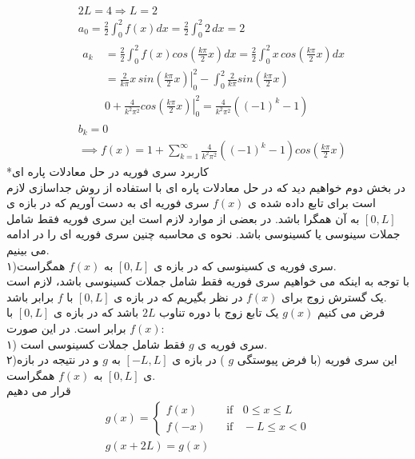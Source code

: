 \begin{equation*}
	\begin{aligned}
		{} &\
		2L=4\Rightarrow L=2
		\\ &\
		a_0=\frac{2}{2}\int_0^2{f(x)dx}=\frac{2}{2}\int_0^2{2 \, dx}=2
		\\ &\
		\begin{aligned}
			a_k {} &\
			= \frac{2}{2}\int_0^2{f(x)cos\left(\frac{k\pi}{2}x\right)dx}=
			\frac{2}{2}\int_0^2{x\,cos\left(\frac{k\pi}{2}x\right)dx}
			\\ &\
			=\left.{\frac{2}{k\pi}x \, sin\left(\frac{k\pi}{2}x\right)}\right |_0^2-\int_0^2{\frac{2}{k\pi} sin\left(\frac{k\pi}{2}x\right)}
			\\ &\
			0+\frac{4}{k^2\pi^2}\left.{cos\left(\frac{k\pi}{2}x\right)} \right |_0^2
			=\frac{4}{k^2\pi^2}\left( (-1)^k-1\right)
		\end{aligned}
		\\ &\
		b_k = 0
		\\ &\
		\implies f(x)=1+\sum_{k=1}^\infty{\frac{4}{k^2\pi^2}\left( (-1)^k-1\right)cos\left( \frac{k\pi}{2}x\right)}
	\end{aligned}
\end{equation*}
*کاربرد سری فوریه در حل معادلات پاره ای\\
در بخش دوم خواهیم دید که در حل معادلات پاره ای با استفاده از روش جداسازی لازم است برای تابع داده شده ی
$f(x)$
سری فوریه ای به دست آوریم که در بازه ی
$[0,L]$
به آن همگرا باشد. در  بعضی از موارد لازم است این سری فوریه فقط شامل جملات سینوسی یا کسینوسی باشد. نحوه ی محاسبه چنین سری فوریه ای را در ادامه می بینیم.\\
۱)سری فوریه ی کسینوسی که در بازه ی
$[0,L]$
به 
$f(x)$
همگراست.\\
با توجه به اینکه می خواهیم سری فوریه فقط شامل جملات کسینوسی باشد، لازم است یک گسترش زوج برای 
$f(x)$
در نظر بگیریم که در بازه ی
$[0,L]$
با 
$f$
برابر باشد.\\
فرض می کنیم 
$g(x)$
یک تابع زوج با دوره تناوب
$2L$
باشد که در بازه ی
$[0,L]$
با 
$f(x)$
برابر است. در این صورت:\\
۱) سری فوریه ی 
$g$
فقط شامل جملات کسینوسی است.\\
۲)این سری فوریه (با فرض پیوستگی
$g$
)
در بازه ی
$[-L,L]$
به
$g$
و در نتیجه در بازه ی
$[0,L]$
به
$f(x)$
همگراست.\\
قرار می دهیم
\begin{equation*}
	\begin{gathered}
		g(x) =
		\begin{cases}
			f(x)       & \quad \text{if }\;\; 0\le x\le L \\
			f(-x)  & \quad \text{if }\;\; -L\le x< 0
		\end{cases}\\
		g(x+2L)=g(x)
	\end{gathered}
\end{equation*}
